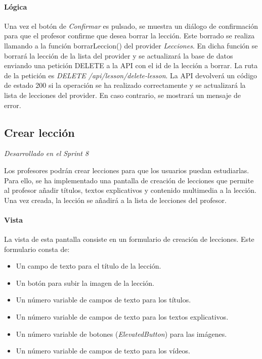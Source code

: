 \paragraph*{Lógica}
Una vez el botón de \textit{Confirmar} es pulsado, se muestra un diálogo de confirmación para que el profesor confirme que desea borrar la lección.
Este borrado se realiza llamando a la función borrarLeccion() del provider \textit{Lecciones}. 
En dicha función se borrará la lección de la lista del provider y se actualizará la base de datos enviando
una petición DELETE a la API con el id de la lección a borrar. La ruta de la petición es \textit{DELETE /api/lesson/delete-lesson}. 
La API devolverá un código de estado 200 si la operación se ha realizado correctamente y se actualizará la lista de lecciones del provider. 
En caso contrario, se mostrará un mensaje de error.


\subsection{Crear lección} 

\textit{Desarrollado en el Sprint 8}

Los profesores podrán crear lecciones para que los usuarios puedan estudiarlas. Para ello, se ha implementado una pantalla de creación de lecciones 
que permite al profesor añadir títulos, textos explicativos y contenido multimedia a la lección. Una vez creada, la lección se añadirá a la lista de lecciones del profesor.


\paragraph*{Vista}
La vista de esta pantalla consiste en un formulario de creación de lecciones. Este formulario consta de:
\begin{itemize}
  \item Un campo de texto para el título de la lección.
  \item Un botón para subir la imagen de la lección.
  \item Un número variable de campos de texto para los títulos.
  \item Un número variable de campos de texto para los textos explicativos.
  \item Un número variable de botones (\textit{ElevatedButton}) para las imágenes.
  \item Un número variable de campos de texto para los vídeos.
\end{itemize}

